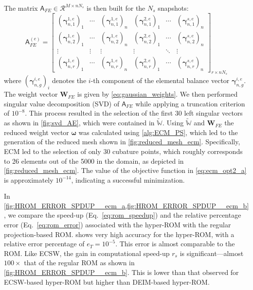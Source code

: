 \documentclass[11pt]{article}
\renewcommand{\vec}[1]{\mathbf{#1}}
\newcommand{\mat}[1]{\mathsf{#1}}
\begin{document}
The matrix $\mat{A}_{FE}\in \mathcal{R}^{M\times n N_s}$ is then built for the $N_s$ snapshots: 
\begin{equation}
 \mat{A}_{FE}^{(e)} = 
\begin{bmatrix} 
\left(\boldsymbol{\gamma}^{1,e}_{n,1}\right)_1 & \cdots & \left(\boldsymbol{\gamma}^{1,e}_{n,1}\right)_n & \left(\boldsymbol{\gamma}^{2,e}_{n,1}\right)_1 &\cdots &\left(\boldsymbol{\gamma}^{s,e}_{n,1}\right)_n\\ 
\left(\boldsymbol{\gamma}^{1,e}_{n,2}\right)_1 & \cdots & \left(\boldsymbol{\gamma}^{1,e}_{n,2}\right)_n & \left(\boldsymbol{\gamma}^{2,e}_{n,2}\right)_1 &\cdots &\left(\boldsymbol{\gamma}^{s,e}_{n,2}\right)_n\\ 
\vdots & \vdots & \vdots & \vdots &\ddots & \vdots \\ 
\left(\boldsymbol{\gamma}^{1,e}_{n,r}\right)_1 & \cdots & \left(\boldsymbol{\gamma}^{1,e}_{n,r}\right)_n & \left(\boldsymbol{\gamma}^{2,e}_{n,r}\right)_1 &\cdots &\left(\boldsymbol{\gamma}^{s,e}_{n,r}\right)_n
\end{bmatrix}_{r \times n N_s}
\end{equation}
where $\left(\boldsymbol{\gamma}^{i,e}_{n,g}\right)_i$ denotes the $i$-th component of the elemental balance vector $\boldsymbol{\gamma}^{i,e}_{n,g}$.
The weight vector $\vec{W}_{FE}$ is given by \cref{eq:gaussian_weights}.
We then performed singular value decomposition (SVD) of \(\mat{A}_{FE}\) while applying a truncation criterion of \(10^{-8}\).
This process resulted in the selection of the first 30 left singular vectors as shown in \cref{fig:svd_AE}, which were contained in \(\widetilde{\mathbb{W}}\).
Using $\widetilde{\mathbb{W}}$ and $\vec{W}_{FE}$ the reduced weight vector $\boldsymbol{\omega}$ was calculated using \cref{alg:ECM_PS}, which led to the generation of the reduced mesh shown in \cref{fig:reduced_mesh_ecm}.
Specifically, ECM led to the selection of only 30 cubature points, which roughly corresponds to 26 elements out of the 5000 in the domain, as depicted in \cref{fig:reduced_mesh_ecm}.
The value of the objective function in \cref{eq:ecm_opt2_a} is approximately $10^{-14}$, indicating a successful minimization.


In \cref{fig:HROM_ERROR_SPDUP__ecm_a,fig:HROM_ERROR_SPDUP__ecm_b}, we compare the speed-up (Eq.~\ref{eq:rom_speedup}) and the relative percentage error (Eq.~\ref{eq:rom_error}) associated with the hyper-ROM with the regular projection-based ROM.
 shows very high accuracy for the hyper-ROM, with a relative error percentage of $e_T = 10^{-5}$.
This error is almost comparable to the ROM.
Like ECSW, the gain in computational speed-up $r_s$ is significant—almost $100\times$ that of the regular ROM as shown in \cref{fig:HROM_ERROR_SPDUP__ecm_b}.
This is lower than that observed for ECSW-based hyper-ROM but higher than DEIM-based hyper-ROM.
\end{document}
